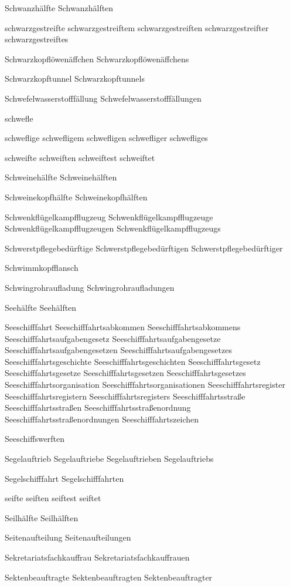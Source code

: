Schwanzhälfte
Schwanzhälften

schwarzgestreifte
schwarzgestreiftem
schwarzgestreiften
schwarzgestreifter
schwarzgestreiftes

Schwarzkopflöwenäffchen
Schwarzkopflöwenäffchens

Schwarzkopftunnel
Schwarzkopftunnels

Schwefelwasserstofffällung
Schwefelwasserstofffällungen

schwefle

schweflige
schwefligem
schwefligen
schwefliger
schwefliges

schweifte
schweiften
schweiftest
schweiftet

Schweinehälfte
Schweinehälften

Schweinekopfhälfte
Schweinekopfhälften

Schwenkflügelkampfflugzeug
Schwenkflügelkampfflugzeuge
Schwenkflügelkampfflugzeugen
Schwenkflügelkampfflugzeugs

Schwerstpflegebedürftige
Schwerstpflegebedürftigen
Schwerstpflegebedürftiger

Schwimmkopfflansch

Schwingrohraufladung
Schwingrohraufladungen

Seehälfte
Seehälften

Seeschifffahrt
Seeschifffahrtsabkommen
Seeschifffahrtsabkommens
Seeschifffahrtsaufgabengesetz
Seeschifffahrtsaufgabengesetze
Seeschifffahrtsaufgabengesetzen
Seeschifffahrtsaufgabengesetzes
Seeschifffahrtsgeschichte
Seeschifffahrtsgeschichten
Seeschifffahrtsgesetz
Seeschifffahrtsgesetze
Seeschifffahrtsgesetzen
Seeschifffahrtsgesetzes
Seeschifffahrtsorganisation
Seeschifffahrtsorganisationen
Seeschifffahrtsregister
Seeschifffahrtsregistern
Seeschifffahrtsregisters
Seeschifffahrtsstraße
Seeschifffahrtsstraßen
Seeschifffahrtsstraßenordnung
Seeschifffahrtsstraßenordnungen
Seeschifffahrtszeichen

Seeschiffswerften

Segelauftrieb
Segelauftriebe
Segelauftrieben
Segelauftriebs

Segelschifffahrt
Segelschifffahrten

seifte
seiften
seiftest
seiftet

Seilhälfte
Seilhälften

Seitenaufteilung
Seitenaufteilungen

Sekretariatsfachkauffrau
Sekretariatsfachkauffrauen

Sektenbeauftragte
Sektenbeauftragten
Sektenbeauftragter

